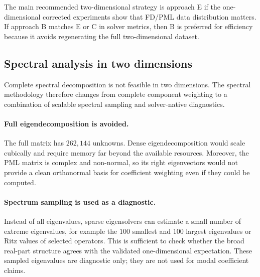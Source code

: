 The main recommended two-dimensional strategy is approach E if the
one-dimensional corrected experiments show that FD/PML data distribution
matters. If approach B matches E or C in solver metrics, then B is preferred
for efficiency because it avoids regenerating the full two-dimensional
dataset.


\subsection{Spectral analysis in two dimensions}
\label{subsec:methodology_2d_spectral_analysis}

Complete spectral decomposition is not feasible in two dimensions. The
spectral methodology therefore changes from complete component weighting to a
combination of scalable spectral sampling and solver-native diagnostics.

\paragraph{Full eigendecomposition is avoided.}
The full matrix has $262{,}144$ unknowns. Dense eigendecomposition would scale
cubically and require memory far beyond the available resources. Moreover,
the PML matrix is complex and non-normal, so its right eigenvectors would not
provide a clean orthonormal basis for coefficient weighting even if they could
be computed.

\paragraph{Spectrum sampling is used as a diagnostic.}
Instead of all eigenvalues, sparse eigensolvers can estimate a small number of
extreme eigenvalues, for example the $100$ smallest and $100$ largest
eigenvalues or Ritz values of selected operators. This is sufficient to check
whether the broad real-part structure agrees with the validated
one-dimensional expectation. These sampled eigenvalues are diagnostic only;
they are not used for modal coefficient claims.

